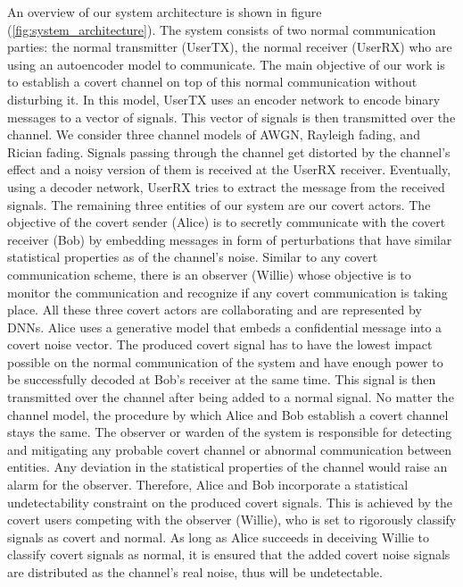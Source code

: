 An overview of our system architecture is shown in figure (\ref{fig:system_architecture}). The system consists of two normal communication parties: the normal transmitter (UserTX), the normal receiver (UserRX) who are using an autoencoder model to communicate. The main objective of our work is to establish a covert channel on top of this normal communication without disturbing it. In this model, UserTX uses an encoder network to encode binary messages to a vector of signals. This vector of signals is then transmitted over the channel. We consider three channel models of AWGN, Rayleigh fading, and Rician fading. Signals passing through the channel get distorted by the channel's effect and a noisy version of them is received at the UserRX receiver. Eventually, using a decoder network, UserRX tries to extract the message from the received signals. The remaining three entities of our system are our covert actors. The objective of the covert sender (Alice) is to secretly communicate with the covert receiver (Bob) by embedding messages in form of perturbations that have similar statistical properties as of the channel's noise. Similar to any covert communication scheme, there is an observer (Willie) whose objective is to monitor the communication and recognize if any covert communication is taking place. All these three covert actors are collaborating and are represented by DNNs. Alice uses a generative model that embeds a confidential message into a covert noise vector. The produced covert signal has to have the lowest impact possible on the normal communication of the system and have enough power to be successfully decoded at Bob's receiver at the same time. This signal is then transmitted over the channel after being added to a normal signal. No matter the channel model, the procedure by which Alice and Bob establish a covert channel stays the same. The observer or warden of the system is responsible for detecting and mitigating any probable covert channel or abnormal communication between entities. Any deviation in the statistical properties of the channel would raise an alarm for the observer. Therefore, Alice and Bob incorporate a statistical undetectability constraint on the produced covert signals. This is achieved by the covert users competing with the observer (Willie), who is set to rigorously classify signals as covert and normal. As long as Alice succeeds in deceiving Willie to classify covert signals as normal, it is ensured that the added covert noise signals are distributed as the channel's real noise, thus will be undetectable.


